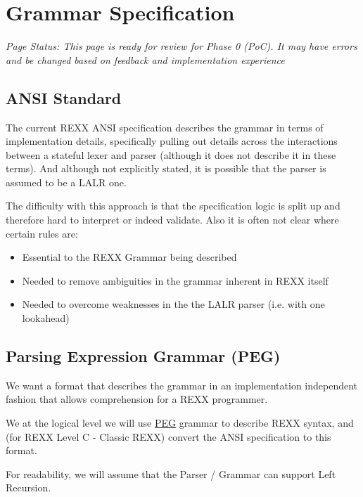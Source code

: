 \section{Grammar Specification}

\emph{Page Status: This page is ready for review for Phase 0 (PoC). It may have errors
and be changed based on feedback and implementation experience}

\subsection{ANSI Standard}

The current REXX ANSI specification describes the grammar in terms of
implementation details, specifically pulling out details across the interactions
between a stateful lexer and parser (although it does not describe it in these
terms). And although not explicitly stated, it is possible that the parser is assumed
to be a LALR one.

The difficulty with this approach is that the specification logic is split up and
therefore hard to interpret or indeed validate. Also it is often not clear where
certain rules are:

\begin{itemize}
\item Essential to the REXX Grammar being described

\item Needed to remove ambiguities in the grammar inherent in REXX itself

\item Needed to overcome weaknesses in the the LALR parser (i.e. with one lookahead)

\end{itemize}

\subsection{Parsing Expression Grammar (PEG)}

We want a format that describes the grammar in an implementation
independent fashion that allows comprehension for a REXX programmer.

We at the logical level we will use \href{https://en.wikipedia.org/wiki/Parsing_expression_grammar}{PEG}
grammar to describe REXX syntax, and (for REXX Level C - Classic REXX) convert the
ANSI specification to this format.

For readability, we will assume that the Parser / Grammar can support Left
Recursion.

